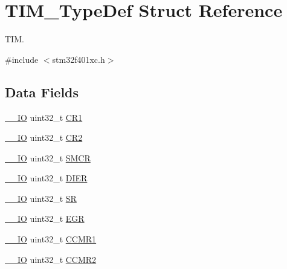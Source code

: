 \hypertarget{struct_t_i_m___type_def}{}\section{T\+I\+M\+\_\+\+Type\+Def Struct Reference}
\label{struct_t_i_m___type_def}


T\+IM.  




{\ttfamily \#include $<$stm32f401xc.\+h$>$}

\subsection*{Data Fields}
\begin{DoxyCompactItemize}
\item 
\hyperlink{core__sc300_8h_aec43007d9998a0a0e01faede4133d6be}{\+\_\+\+\_\+\+IO} uint32\+\_\+t \hyperlink{struct_t_i_m___type_def_ab0ec7102960640751d44e92ddac994f0}{C\+R1}
\item 
\hyperlink{core__sc300_8h_aec43007d9998a0a0e01faede4133d6be}{\+\_\+\+\_\+\+IO} uint32\+\_\+t \hyperlink{struct_t_i_m___type_def_afdfa307571967afb1d97943e982b6586}{C\+R2}
\item 
\hyperlink{core__sc300_8h_aec43007d9998a0a0e01faede4133d6be}{\+\_\+\+\_\+\+IO} uint32\+\_\+t \hyperlink{struct_t_i_m___type_def_a2870732a4fc2ecd7bbecfbcbbf5528b7}{S\+M\+CR}
\item 
\hyperlink{core__sc300_8h_aec43007d9998a0a0e01faede4133d6be}{\+\_\+\+\_\+\+IO} uint32\+\_\+t \hyperlink{struct_t_i_m___type_def_a07fccbd85b91e6dca03ce333c1457fcb}{D\+I\+ER}
\item 
\hyperlink{core__sc300_8h_aec43007d9998a0a0e01faede4133d6be}{\+\_\+\+\_\+\+IO} uint32\+\_\+t \hyperlink{struct_t_i_m___type_def_af6aca2bbd40c0fb6df7c3aebe224a360}{SR}
\item 
\hyperlink{core__sc300_8h_aec43007d9998a0a0e01faede4133d6be}{\+\_\+\+\_\+\+IO} uint32\+\_\+t \hyperlink{struct_t_i_m___type_def_a196ebdaac12b21e90320c6175da78ef6}{E\+GR}
\item 
\hyperlink{core__sc300_8h_aec43007d9998a0a0e01faede4133d6be}{\+\_\+\+\_\+\+IO} uint32\+\_\+t \hyperlink{struct_t_i_m___type_def_adb72f64492a75e780dd2294075c70fed}{C\+C\+M\+R1}
\item 
\hyperlink{core__sc300_8h_aec43007d9998a0a0e01faede4133d6be}{\+\_\+\+\_\+\+IO} uint32\+\_\+t \hyperlink{struct_t_i_m___type_def_a091452256c9a16c33d891f4d32b395bf}{C\+C\+M\+R2}
\item 

\end{DoxyCompactItemize}
